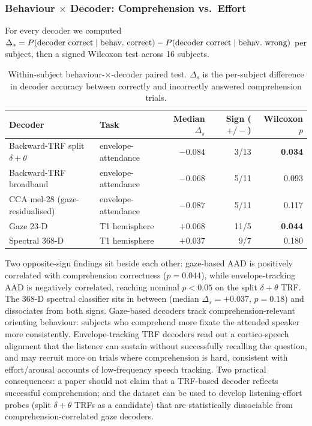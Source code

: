 \documentclass{article}
\begin{document}
\subsubsection{Behaviour $\times$ Decoder: Comprehension vs.\ Effort}
\label{app:behxdec}

For every decoder we computed $\Delta_s = P(\text{decoder correct} \mid
\text{behav.\ correct}) - P(\text{decoder correct} \mid \text{behav.\
wrong})$ per subject, then a signed Wilcoxon test across 16 subjects.

\begin{table}[ht]
\centering
\small
\caption{Within-subject behaviour-$\times$-decoder paired test. $\Delta_s$
is the per-subject difference in decoder accuracy between correctly and
incorrectly answered comprehension trials.}
\label{tab:behxdec}
\begin{tabular}{llrrr}
\toprule
Decoder & Task & Median $\Delta_s$ & Sign ($+/-$) & Wilcoxon $p$ \\
\midrule
Backward-TRF split $\delta{+}\theta$ & envelope-attendance & $-0.084$ & 3/13 & \textbf{0.034} \\
Backward-TRF broadband               & envelope-attendance & $-0.068$ & 5/11 & 0.093 \\
CCA mel-28 (gaze-residualised)       & envelope-attendance & $-0.087$ & 5/11 & 0.117 \\
Gaze 23-D                            & T1 hemisphere       & $+0.068$ & 11/5 & \textbf{0.044} \\
Spectral 368-D                       & T1 hemisphere       & $+0.037$ & 9/7  & 0.180 \\
\bottomrule
\end{tabular}
\end{table}

Two opposite-sign findings sit beside each other: gaze-based AAD is
positively correlated with comprehension correctness ($p{=}0.044$), while
envelope-tracking AAD is negatively correlated, reaching nominal $p{<}0.05$
on the split $\delta{+}\theta$ TRF. The 368-D spectral classifier sits in
between (median $\Delta_s{=}+0.037$, $p{=}0.18$) and dissociates from both
signs. Gaze-based decoders track comprehension-relevant orienting behaviour:
subjects who comprehend more fixate the attended speaker more consistently.
Envelope-tracking TRF decoders read out a cortico-speech alignment that the
listener can sustain without successfully recalling the question, and may
recruit more on trials where comprehension is hard, consistent with
effort/arousal accounts of low-frequency speech tracking. Two practical
consequences: a paper should not claim that a TRF-based decoder reflects
successful comprehension; and the dataset can be used to develop
listening-effort probes (split $\delta{+}\theta$ TRFs as a candidate) that
are statistically dissociable from comprehension-correlated gaze decoders.
\end{document}
